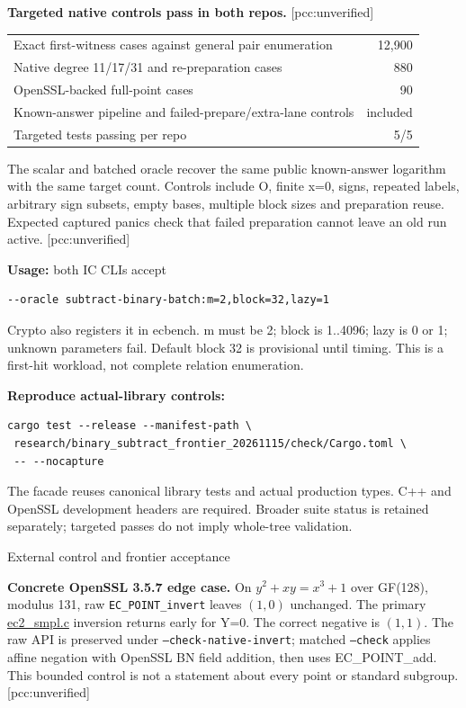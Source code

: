\documentclass[10pt]{article}
\begin{document}
\textbf{Targeted native controls pass in both repos.} [pcc:unverified]
\begin{center}\begin{tabular}{lr}
Exact first-witness cases against general pair enumeration&12,900\\
Native degree 11/17/31 and re-preparation cases&880\\
OpenSSL-backed full-point cases&90\\
Known-answer pipeline and failed-prepare/extra-lane controls&included\\
Targeted tests passing per repo&5/5
\end{tabular}\end{center}
The scalar and batched oracle recover the same public known-answer logarithm with the same target count. Controls include O, finite x=0, signs, repeated labels, arbitrary sign subsets, empty bases, multiple block sizes and preparation reuse. Expected captured panics check that failed preparation cannot leave an old run active. [pcc:unverified]

\textbf{Usage:} both IC CLIs accept
\begin{verbatim}
--oracle subtract-binary-batch:m=2,block=32,lazy=1
\end{verbatim}
Crypto also registers it in ecbench. m must be 2; block is 1..4096; lazy is 0 or 1; unknown parameters fail. Default block 32 is provisional until timing. This is a first-hit workload, not complete relation enumeration.

\textbf{Reproduce actual-library controls:}
\begin{verbatim}
cargo test --release --manifest-path \
 research/binary_subtract_frontier_20261115/check/Cargo.toml \
 -- --nocapture
\end{verbatim}
The facade reuses canonical library tests and actual production types. C++ and OpenSSL development headers are required. Broader suite status is retained separately; targeted passes do not imply whole-tree validation.
\newpage
\begin{center}\Large External control and frontier acceptance\end{center}
\textbf{Concrete OpenSSL 3.5.7 edge case.} On
$y^2+xy=x^3+1$ over GF(128), modulus 131, raw \texttt{EC\_POINT\_invert} leaves $(1,0)$ unchanged. The primary \href{https://github.com/openssl/openssl/blob/openssl-3.5.7/crypto/ec/ec2_smpl.c}{ec2\_smpl.c} inversion returns early for Y=0. The correct negative is $(1,1)$. The raw API is preserved under \texttt{--check-native-invert}; matched \texttt{--check} applies affine negation with OpenSSL BN field addition, then uses EC\_POINT\_add. This bounded control is not a statement about every point or standard subgroup. [pcc:unverified]
\end{document}
